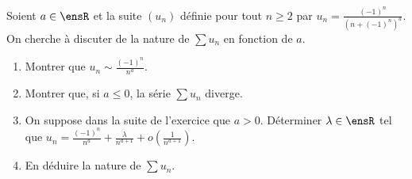\noindent Soient $a \in \ensR$ et la suite $(u_n)$ définie pour tout $n \geq 2$ par $\displaystyle u_n = \frac{(-1)^n}{(n + (-1)^n)^a}$. On cherche à discuter de la nature de $\sum u_n$ en fonction de $a$.

\begin{enumerate}
    \item Montrer que $\displaystyle u_n \sim \frac{(-1)^n}{n^a}$.
    \item Montrer que, si $a \leq 0$, la série $\sum u_n$ diverge.
    \item On suppose dans la suite de l'exercice que $a > 0$. Déterminer $\lambda \in \ensR$ tel que $\displaystyle u_n = \frac{(-1)^n}{n^a} + \frac{\lambda}{n^{a + 1}} + o(\frac{1}{n^{a + 1}})$.
    \item En déduire la nature de $\sum u_n$.
\end{enumerate}